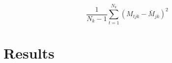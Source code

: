\documentclass[11pt]{article}
\begin{document}
%

%
%

\begin{equation}
{ \frac{1}{N_k-1} \sum \limits_{t=1}^{N_k} (M_{tjk} - \bar{M}_{jk})^2}
\end{equation}


%

\section*{Results}
\end{document}
